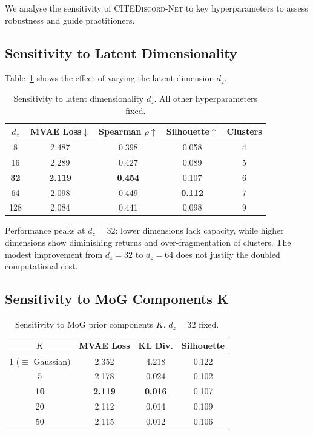 \documentclass[11pt,a4paper]{article}
\newcommand{\citenet}{\textsc{CITEDiscord-Net}}
\begin{document}
We analyse the sensitivity of \citenet{} to key hyperparameters to assess robustness and guide practitioners.

\subsection{Sensitivity to Latent Dimensionality}

Table~\ref{tab:latent_dim_sens} shows the effect of varying the latent dimension $d_z$.

\begin{table}[!ht]
\centering
\caption{Sensitivity to latent dimensionality $d_z$. All other hyperparameters fixed.}
\label{tab:latent_dim_sens}
\scriptsize
\begin{tabular}{c c c c c}
\toprule
$d_z$ & MVAE Loss$\downarrow$ & Spearman $\rho$$\uparrow$ & Silhouette$\uparrow$ & Clusters \\
\midrule
8  & 2.487 & 0.398 & 0.058 & 4 \\
16 & 2.289 & 0.427 & 0.089 & 5 \\
\textbf{32} & \textbf{2.119} & \textbf{0.454} & 0.107 & 6 \\
64 & 2.098 & 0.449 & \textbf{0.112} & 7 \\
128 & 2.084 & 0.441 & 0.098 & 9 \\
\bottomrule
\end{tabular}
\end{table}

Performance peaks at $d_z=32$: lower dimensions lack capacity, while higher dimensions show diminishing returns and over-fragmentation of clusters.
The modest improvement from $d_z=32$ to $d_z=64$ does not justify the doubled computational cost.

\subsection{Sensitivity to MoG Components K}

\begin{table}[!ht]
\centering
\caption{Sensitivity to MoG prior components $K$. $d_z=32$ fixed.}
\label{tab:mog_sens}
\scriptsize
\begin{tabular}{c c c c}
\toprule
$K$ & MVAE Loss & KL Div. & Silhouette \\
\midrule
1 ($\equiv$ Gaussian) & 2.352 & 4.218 & 0.122 \\
5  & 2.178 & 0.024 & 0.102 \\
\textbf{10} & \textbf{2.119} & \textbf{0.016} & 0.107 \\
20 & 2.112 & 0.014 & 0.109 \\
50 & 2.115 & 0.012 & 0.106 \\
\bottomrule
\end{tabular}
\end{table}
\end{document}
